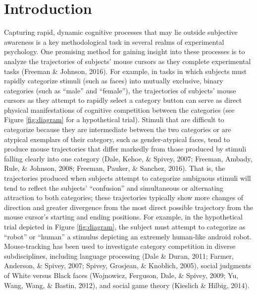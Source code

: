\documentclass[]{article}
\begin{document}
\section{Introduction}

Capturing rapid, dynamic cognitive processes that may lie outside
subjective awareness is a key methodological task in several realms of
experimental psychology. One promising method for gaining insight into
these processes is to analyze the trajectories of subjects' mouse
cursors as they complete experimental tasks (Freeman \& Johnson, 2016).
For example, in tasks in which subjects must rapidly categorize stimuli
(such as faces) into mutually exclusive, binary categories (such as
``male'' and ``female''), the trajectories of subjects' mouse cursors as
they attempt to rapidly select a category button can serve as direct
physical manifestations of cognitive competition between the categories
(see Figure \ref{fig:diagram} for a hypothetical trial). Stimuli that
are difficult to categorize because they are intermediate between the
two categories or are atypical exemplars of their category, such as
gender-atypical faces, tend to produce mouse trajectories that differ
markedly from those produced by stimuli falling clearly into one
category (Dale, Kehoe, \& Spivey, 2007; Freeman, Ambady, Rule, \&
Johnson, 2008; Freeman, Pauker, \& Sanchez, 2016). That is, the
trajectories produced when subjects attempt to categorize ambiguous
stimuli will tend to reflect the subjects' ``confusion'' and
simultaneous or alternating attraction to both categories; these
trajectories typically show more changes of direction and greater
divergence from the most direct possible trajectory from the mouse
cursor's starting and ending positions. For example, in the hypothetical
trial depicted in Figure \ref{fig:diagram}, the subject must attempt to
categorize as ``robot'' or ``human'' a stimulus depicting an extremely
human-like android robot. Mouse-tracking has been used to investigate
category competition in diverse subdisciplines, including language
processing (Dale \& Duran, 2011; Farmer, Anderson, \& Spivey, 2007;
Spivey, Grosjean, \& Knoblich, 2005), social judgments of White versus
Black faces (Wojnowicz, Ferguson, Dale, \& Spivey, 2009; Yu, Wang, Wang,
\& Bastin, 2012), and social game theory (Kieslich \& Hilbig, 2014).
\end{document}

